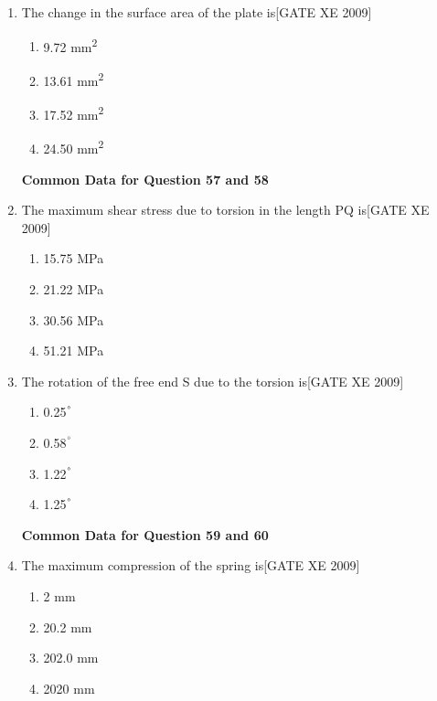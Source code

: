 \documentclass[journal,12pt,onecolumn]{IEEEtran}
\theoremstyle{remark}
\begin{document}
\begin{enumerate}
\item The change in the surface area of the plate is\hfill[GATE XE 2009]
\begin{multicols}{2}
\begin{enumerate}
    \item 9.72 mm\textsuperscript{2}
    \item 13.61 mm\textsuperscript{2}
    \item 17.52 mm\textsuperscript{2}
    \item 24.50 mm\textsuperscript{2}
\end{enumerate}
\end{multicols}



\textbf{Common Data for Question 57 and 58}

\item The maximum shear stress due to torsion in the length PQ is\hfill[GATE XE 2009]
\begin{multicols}{2}
\begin{enumerate}
    \item 15.75 MPa
    \item 21.22 MPa
    \item 30.56 MPa
    \item 51.21 MPa
\end{enumerate}
\end{multicols}

\item  The rotation of the free end S due to the torsion is\hfill[GATE XE 2009]
\begin{multicols}{2}
\begin{enumerate}
    \item 0.25$^\degree$
    \item 0.58$^\degree$
    \item 1.22$^\degree$
    \item 1.25$^\degree$
\end{enumerate}
\end{multicols}



\textbf{Common Data for Question 59 and 60}

\item The maximum compression of the spring is\hfill[GATE XE 2009]
\begin{multicols}{2}
\begin{enumerate}
    \item 2 mm
    \item 20.2 mm
    \item 202.0 mm
    \item 2020 mm
\end{enumerate}
\end{multicols}




\end{enumerate}
\end{document}

